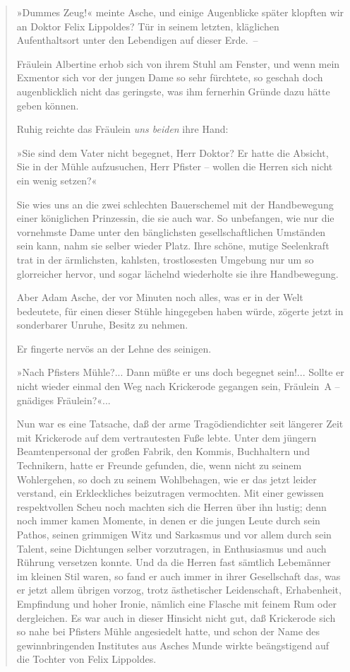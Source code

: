 \begin{verse}
»Dummes Zeug!« meinte Asche, und einige Augenblicke später klopften
wir an Doktor Felix Lippoldes? Tür in seinem letzten, kläglichen
Aufenthaltsort unter den Lebendigen auf dieser Erde.~–

Fräulein Albertine erhob sich von ihrem Stuhl am Fenster, und wenn
mein Exmentor sich vor der jungen Dame so sehr fürchtete, so
geschah doch augenblicklich nicht das geringste, was ihm fernerhin
Gründe dazu hätte geben können.

Ruhig reichte das Fräulein \emph{uns beiden} ihre Hand:

»Sie sind dem Vater nicht begegnet, Herr Doktor? Er hatte die
Absicht, Sie in der Mühle aufzusuchen, Herr Pfister – wollen die
Herren sich nicht ein wenig setzen?«

Sie wies uns an die zwei schlechten Bauerschemel mit der
Handbewegung einer königlichen Prinzessin, die sie auch war. So
unbefangen, wie nur die vornehmste Dame unter den bänglichsten
gesellschaftlichen Umständen sein kann, nahm sie selber wieder
Platz. Ihre schöne, mutige Seelenkraft trat in der ärmlichsten,
kahlsten, trostlosesten Umgebung nur um so glorreicher hervor, und
sogar lächelnd wiederholte sie ihre Handbewegung.

Aber Adam Asche, der vor Minuten noch alles, was er in der Welt
bedeutete, für einen dieser Stühle hingegeben haben würde, zögerte
jetzt in sonderbarer Unruhe, Besitz zu nehmen.

Er fingerte nervös an der Lehne des seinigen.

»Nach Pfisters Mühle?... Dann müßte er uns doch begegnet sein!...
Sollte er nicht wieder einmal den Weg nach Krickerode gegangen
sein, Fräulein~A – gnädiges Fräulein?«...

Nun war es eine Tatsache, daß der arme Tragödiendichter seit
längerer Zeit mit Krickerode auf dem vertrautesten Fuße lebte.
Unter dem jüngern Beamtenpersonal der großen Fabrik, den Kommis,
Buchhaltern und Technikern, hatte er Freunde gefunden, die, wenn
nicht zu seinem Wohlergehen, so doch zu seinem Wohlbehagen, wie er
das jetzt leider verstand, ein Erkleckliches beizutragen
vermochten. Mit einer gewissen respektvollen Scheu noch machten
sich die Herren über ihn lustig; denn noch immer kamen Momente, in
denen er die jungen Leute durch sein Pathos, seinen grimmigen Witz
und Sarkasmus und vor allem durch sein Talent, seine Dichtungen
selber vorzutragen, in Enthusiasmus und auch Rührung versetzen
konnte. Und da die Herren fast sämtlich Lebemänner im kleinen Stil
waren, so fand er auch immer in ihrer Gesellschaft das, was er
jetzt allem übrigen vorzog, trotz ästhetischer Leidenschaft,
Erhabenheit, Empfindung und hoher Ironie, nämlich eine Flasche mit
feinem Rum oder dergleichen. Es war auch in dieser Hinsicht nicht
gut, daß Krickerode sich so nahe bei Pfisters Mühle angesiedelt
hatte, und schon der Name des gewinnbringenden Institutes aus
Asches Munde wirkte beängstigend auf die Tochter von Felix
Lippoldes.


\end{verse}
